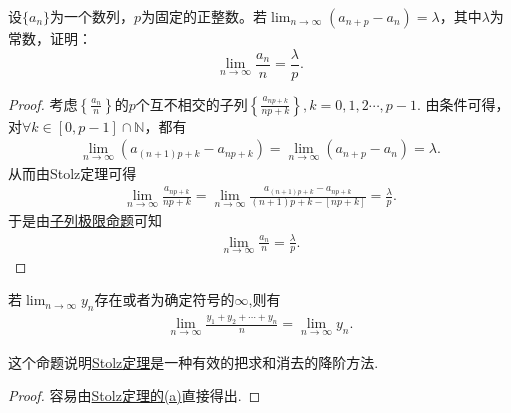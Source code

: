 \documentclass[../../main.tex]{subfiles}%
\begin{document}
\begin{proposition}\label{proposition:Stolz公式的推论111}
设$\{a_n\}$为一个数列，$p$为固定的正整数。若$\lim_{n \to \infty} (a_{n+p} - a_n) = \lambda$，其中$\lambda$为常数，证明：
\[
\lim_{n \to \infty} \frac{a_n}{n} = \frac{\lambda}{p}.
\]
\end{proposition}
\begin{proof}
考虑$\left\{ \frac{a_n}{n} \right\}$的$p$个互不相交的子列$\left\{ \frac{a_{np+k}}{np+k} \right\},k=0,1,2\cdots,p-1$.
由条件可得，对$\forall k\in \left[ 0,p-1 \right] \cap \mathbb{N}$，都有
\begin{align*}
\lim_{n\rightarrow \infty}\left( a_{\left( n+1 \right) p+k}-a_{np+k} \right)=\lim_{n\rightarrow \infty}\left( a_{n+p}-a_n \right)=\lambda.
\end{align*}
从而由Stolz定理可得
\begin{align*}
\lim_{n\rightarrow \infty}\frac{a_{np+k}}{np+k}=\lim_{n\rightarrow \infty}\frac{a_{\left( n+1 \right) p+k}-a_{np+k}}{\left( n+1 \right) p+k-\left[ np+k \right]}=\frac{\lambda}{p}.
\end{align*}
于是由\hyperref[proposition:子列极限命题]{子列极限命题}可知
\begin{align*}
\lim_{n\rightarrow \infty}\frac{a_n}{n}=\frac{\lambda}{p}.
\end{align*}
\end{proof}

\begin{proposition}[Cauchy命题]\label{proposition:Cauchy命题}
若\(\lim_{n \to \infty} y_n\)存在或者为确定符号的\(\infty\),则有
\begin{align*}
\lim_{n \to \infty} \frac{y_1 + y_2 + \cdots + y_n}{n} = \lim_{n \to \infty} y_n.
\end{align*}
\end{proposition}
\begin{note}
这个命题说明\hyperref[theorem:Stolz定理]{Stolz定理}是一种有效的把求和消去的降阶方法.
\end{note}
\begin{proof}
容易由\hyperref[theorem:Stolz定理]{Stolz定理的(a)}直接得出.
\end{proof}
\end{document}
